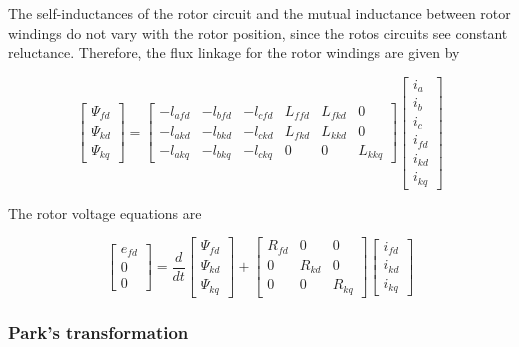 The self-inductances of the rotor circuit and the mutual inductance between rotor windings do not vary with the rotor position, since the rotos circuits see constant reluctance. Therefore, the flux linkage for the rotor windings are given by

\begin{equation}
	\begin{bmatrix}
		\Psi_{fd} \\
		\Psi_{kd} \\
		\Psi_{kq}
	\end{bmatrix}
	=
	\begin{bmatrix}
		-l_{afd} & -l_{bfd} & -l_{cfd} & L_{ffd} & L_{fkd} & 0 \\  
		-l_{akd} & -l_{bkd} & -l_{ckd} & L_{fkd} & L_{kkd} & 0 \\  
		-l_{akq} & -l_{bkq} & -l_{ckq} & 0       & 0       & L_{kkq}  
	\end{bmatrix}
	\begin{bmatrix}
		i_a \\
		i_b \\
		i_c \\
		i_{fd} \\
		i_{kd} \\
		i_{kq}
	\end{bmatrix}
\end{equation}

The rotor voltage equations are

\begin{equation}
	\begin{bmatrix}
		e_{fd} \\
		0 \\
		0
	\end{bmatrix}
	=
	\frac{d}{dt}
	\begin{bmatrix}
		\Psi_{fd} \\
		\Psi_{kd} \\
		\Psi_{kq}
	\end{bmatrix}
	+
	\begin{bmatrix}
		R_{fd} & 0 & 0 \\
		0 & R_{kd} & 0 \\
		0 & 0 & R_{kq}
	\end{bmatrix}
	\begin{bmatrix}
		i_{fd} \\
		i_{kd} \\
		i_{kq}
	\end{bmatrix}
\end{equation}

\subsubsection{Park's transformation}

